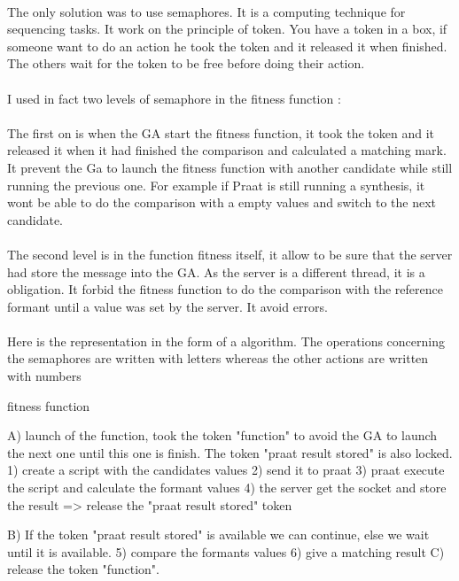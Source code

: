 \documentclass[12pt]{report}
\begin{document}
\paragraph*{}
The only solution was to use semaphores. It is a computing technique for sequencing tasks. It work on the principle of token. You have a token in a box, if someone want to do an action he took the token and it released it when finished. The others wait for the token to be free before doing their action.

\paragraph*{}
I used in fact two levels of semaphore in the fitness function :


\paragraph*{}
The first on is when the GA start the fitness function, it took the token and it released it when it had finished the comparison and calculated a matching mark. It prevent the Ga to launch the fitness function with another candidate while still running the previous one. For example if Praat is still running a synthesis, it wont be able to do the comparison with a empty values and switch to the next candidate.

\paragraph*{}
The second level is in the function fitness itself, it allow to be sure that the server had store the message into the GA. As the server is a different thread, it is a obligation. It forbid the fitness function to do the comparison with the reference formant until a value was set by the server. It avoid errors.

\paragraph*{}
Here is the representation in the form of a algorithm. The operations concerning the semaphores are written with letters whereas the other actions are written with numbers
\begin{verbatimtab}[3]
fitness function{
	A) launch of the function, took the token "function" to avoid the GA to launch the next one until 		   this one is finish. The token "praat result stored" is also locked.
		1) create a script with the candidates values
		2) send it to praat
		3) praat execute the script and calculate the formant values 
		4) the server get the socket and store the result
			=> release the "praat result stored" token
		
		B) If the token "praat result stored" is available we can continue, else we wait until it is 		available.
			5) compare the formants values
			6) give a matching result
	C) release the token "function".
}
\end{verbatimtab}
\end{document}
